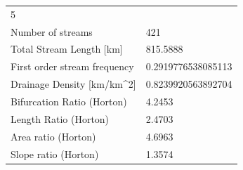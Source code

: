 \documentclass[11pt,]{article}
\begin{document}
\begin{longtable}[]{@{}ll@{}}
\begin{minipage}[t]{0.28\columnwidth}
5\strut
\end{minipage}\tabularnewline
\begin{minipage}[t]{0.66\columnwidth}\raggedright\strut
Number of streams\strut
\end{minipage} & \begin{minipage}[t]{0.28\columnwidth}\raggedright\strut
421\strut
\end{minipage}\tabularnewline
\begin{minipage}[t]{0.66\columnwidth}\raggedright\strut
Total Stream Length {[}km{]}\strut
\end{minipage} & \begin{minipage}[t]{0.28\columnwidth}\raggedright\strut
815.5888\strut
\end{minipage}\tabularnewline
\begin{minipage}[t]{0.66\columnwidth}\raggedright\strut
First order stream frequency\strut
\end{minipage} & \begin{minipage}[t]{0.28\columnwidth}\raggedright\strut
0.2919776538085113\strut
\end{minipage}\tabularnewline
\begin{minipage}[t]{0.66\columnwidth}\raggedright\strut
Drainage Density {[}km/km\^{}2{]}\strut
\end{minipage} & \begin{minipage}[t]{0.28\columnwidth}\raggedright\strut
0.8239920563892704\strut
\end{minipage}\tabularnewline
\begin{minipage}[t]{0.66\columnwidth}\raggedright\strut
Bifurcation Ratio (Horton)\strut
\end{minipage} & \begin{minipage}[t]{0.28\columnwidth}\raggedright\strut
4.2453\strut
\end{minipage}\tabularnewline
\begin{minipage}[t]{0.66\columnwidth}\raggedright\strut
Length Ratio (Horton)\strut
\end{minipage} & \begin{minipage}[t]{0.28\columnwidth}\raggedright\strut
2.4703\strut
\end{minipage}\tabularnewline
\begin{minipage}[t]{0.66\columnwidth}\raggedright\strut
Area ratio (Horton)\strut
\end{minipage} & \begin{minipage}[t]{0.28\columnwidth}\raggedright\strut
4.6963\strut
\end{minipage}\tabularnewline
\begin{minipage}[t]{0.66\columnwidth}\raggedright\strut
Slope ratio (Horton)\strut
\end{minipage} & \begin{minipage}[t]{0.28\columnwidth}\raggedright\strut
1.3574\strut
\end{minipage}\tabularnewline
\bottomrule
\end{longtable}
\end{document}
